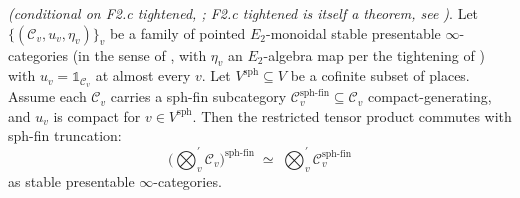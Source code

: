 \begin{theorem}
\label{v4-arith:lacd:thm:L1-closed}
\ClaimStatusProvedHereConditional \emph{(conditional on F2.c tightened,
; F2.c tightened is itself a theorem,
see )}. Let
\(\{(\mathcal{C}_{v}, u_{v}, \eta_{v})\}_{v}\) be a family of pointed
\(E_{2}\)-monoidal stable presentable \(\infty\)-categories (in the
sense of , with \(\eta_{v}\) an
\(E_{2}\)-algebra map per the tightening of
)
with \(u_{v} = \mathbb{1}_{\mathcal{C}_{v}}\) at almost every \(v\). Let
\(V^{\mathrm{sph}} \subseteq V\) be a cofinite subset of places.
Assume each \(\mathcal{C}_{v}\) carries a sph-fin subcategory
\(\mathcal{C}_{v}^{\mathrm{sph\text{-}fin}} \subseteq \mathcal{C}_{v}\)
compact-generating, and \(u_{v}\) is compact for \(v \in V^{\mathrm{sph}}\).
Then the restricted tensor product commutes with sph-fin truncation:
\begin{equation}
\label{v4-arith:lacd:eq:colim-commutes}
\bigl(\bigotimes_{v}^{\prime}\mathcal{C}_{v}\bigr)^{\mathrm{sph\text{-}fin}}
\;\simeq\;
\bigotimes_{v}^{\prime}\mathcal{C}_{v}^{\mathrm{sph\text{-}fin}}
\end{equation}
as stable presentable \(\infty\)-categories.
\end{theorem}

